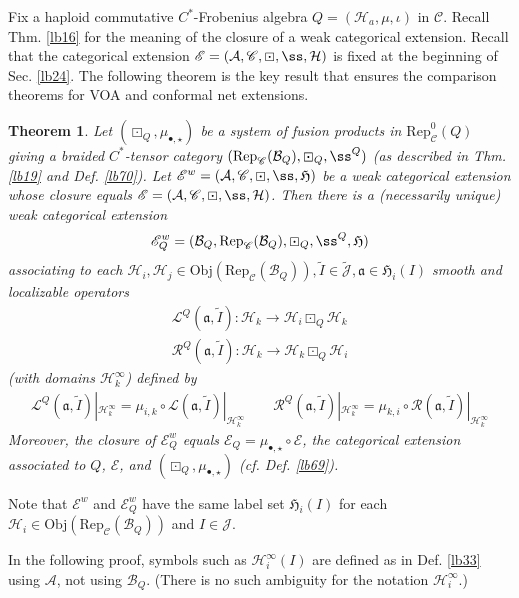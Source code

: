 \documentclass[11pt,b5paper,notitlepage]{article}
\theoremstyle{definition}
\theoremstyle{plain}
\newtheorem{thm}[df]{Theorem}
\newcommand{\fk}{\mathfrak}
\newcommand{\mc}{\mathcal}
\newcommand{\wtd}{\widetilde}
\newcommand{\Rep}{\mathrm{Rep}}
\newcommand{\scr}{\mathscr}
\newcommand{\Jtd}{\widetilde{\mathcal J}}
\newcommand{\blt}{\bullet}
\newcommand{\Obj}{\mathrm{Obj}}
\numberwithin{equation}{section}
\begin{document}
Fix a haploid commutative $C^*$-Frobenius algebra $Q=(\mc H_a,\mu,\iota)$ in $\scr C$. Recall Thm. \ref{lb16} for the meaning of the closure of a weak categorical extension. Recall that the categorical extension $\scr E=(\mc A,\scr C,\boxdot,\ss,\mc H)$ is fixed at the beginning of Sec. \ref{lb24}. The following theorem is the key result that ensures the comparison theorems for VOA and conformal net extensions.



\begin{thm}\label{lb71}
Let $(\boxdot_Q,\mu_{\blt,\star})$ be a system of fusion products in $\Rep^0_{\scr C}(Q)$ giving a braided $C^*$-tensor category $(\Rep_{\scr C}(\mc B_Q),\boxdot_Q,\ss^Q)$ (as described in Thm. \ref{lb19} and Def. \ref{lb70}). Let $\scr E^w=(\mc A,\scr C,\boxdot,\ss,\fk H)$ be a weak categorical extension whose closure equals $\scr E=(\mc A,\scr C,\boxdot,\ss,\mc H)$. Then there is a (necessarily unique) weak categorical extension
\begin{align}
\scr E^w_Q=(\mc B_Q,\Rep_{\scr C}(\mc B_Q),\boxdot_Q,\ss^Q,\fk H)
\end{align}
associating to each $\mc H_i,\mc H_j\in\Obj(\Rep_{\scr C}(\mc B_Q)),\wtd I\in\Jtd,\fk a\in\fk H_i(I)$ smooth and localizable operators
\begin{gather*}
\mc L^Q(\fk a,\wtd I):\mc H_k\rightarrow\mc H_i\boxdot_Q\mc H_k\\
\mc R^Q(\fk a,\wtd I):\mc H_k\rightarrow\mc H_k\boxdot_Q\mc H_i
\end{gather*}
(with domains $\mc H_k^\infty$) defined by
\begin{align}\label{eq16}
\mc L^Q(\fk a,\wtd I)|_{\mc H_k^\infty}=\mu_{i,k}\circ \mc L(\fk a,\wtd I)|_{\mc H_k^\infty}\qquad \mc R^Q(\fk a,\wtd I)|_{\mc H_k^\infty}=\mu_{k,i}\circ \mc R(\fk a,\wtd I)|_{\mc H_k^\infty}
\end{align}
Moreover, the closure of $\scr E_Q^w$ equals $\scr E_Q=\mu_{\blt,\star}\circ\scr E$, the categorical extension associated to $Q$, $\scr E$, and $(\boxdot_Q,\mu_{\blt,\star})$ (cf. Def. \ref{lb69}).
\end{thm}

Note that $\scr E^w$ and $\scr E^w_Q$ have the same label set $\fk H_i(I)$ for each $\mc H_i\in\Obj(\Rep_{\scr C}(\mc B_Q))$ and $I\in\mc J$.

In the following proof, symbols such as $\mc H_i^\infty(I)$ are defined as in Def. \ref{lb33} using $\mc A$, not using $\mc B_Q$. (There is no such ambiguity for the notation $\mc H_i^\infty$.)
\end{document}
